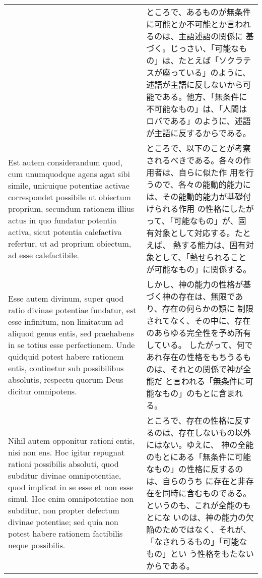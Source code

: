 \documentclass[10pt]{jsarticle} %
\begin{document}
\begin{longtable}{p{21em}p{21em}}
&

ところで、あるものが無条件に可能とか不可能とか言われるのは、主語述語の関係に
 基づく。じっさい、「可能なもの」は、たとえば「ソクラテスが座っている」のように、
 述語が主語に反しないから可能である。他方、「無条件に不可能なもの」は、「人間は
 ロバである」のように、述語が主語に反するからである。

\\


Est autem considerandum quod, cum unumquodque agens agat sibi
simile, unicuique potentiae activae correspondet possibile ut obiectum
proprium, secundum rationem illius actus in quo fundatur potentia
activa, sicut potentia calefactiva refertur, ut ad proprium obiectum, ad
esse calefactibile. 

&

ところで、以下のことが考察されるべきである。各々の作用者は、自らに似た作
 用を行うので、各々の能動的能力には、その能動的能力が基礎付けられる作用
 の性格にしたがって、「可能なもの」が、固有対象として対応する。たとえば、
 熱する能力は、固有対象として、「熱せられることが可能なもの」に関係する。

\\


Esse autem divinum, super quod ratio divinae
potentiae fundatur, est esse infinitum, non limitatum ad aliquod genus
entis, sed praehabens in se totius esse perfectionem. Unde quidquid
potest habere rationem entis, continetur sub possibilibus absolutis,
respectu quorum Deus dicitur omnipotens. 

&

しかし、神の能力の性格が基づく神の存在は、無限であり、存在の何らかの類に
 制限されてなく、その中に、存在のあらゆる完全性を予め所有している。
したがって、何であれ存在の性格をもちうるものは、それとの関係で神が全能だ
 と言われる「無条件に可能なもの」のもとに含まれる。


\\

Nihil autem opponitur rationi
entis, nisi non ens. 
Hoc igitur repugnat rationi possibilis absoluti,
quod subditur divinae omnipotentiae, quod implicat in se esse et non
esse simul. Hoc enim omnipotentiae non subditur, non propter defectum
divinae potentiae; sed quia non potest habere rationem factibilis neque
possibilis. 

&

ところで、存在の性格に反するのは、存在しないもの以外にはない。ゆえに、
神の全能のもとにある「無条件に可能なもの」の性格に反するのは、自らのうち
 に存在と非存在を同時に含むものである。というのも、これが全能のもとにな
 いのは、神の能力の欠陥のためではなく、それが、「なされうるもの」「可能なもの」とい
 う性格をもたないからである。


\end{longtable}
\end{document}
